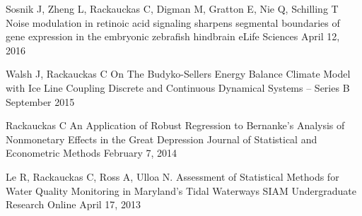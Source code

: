 

\begin{cventries}
	
\cventry
{Sosnik J, Zheng L, Rackauckas C, Digman M, Gratton E, Nie Q, Schilling T} %
{Noise modulation in retinoic acid signaling sharpens segmental boundaries of gene expression in the embryonic zebrafish hindbrain} %
{eLife Sciences} %
{April 12, 2016} %
{}

\cventry
{Walsh J, Rackauckas C} %
{On The Budyko-Sellers Energy Balance Climate Model with Ice Line Coupling} %
{Discrete and Continuous Dynamical Systems – Series B} %
{September 2015} %
{}


  \cventry
    {Rackauckas C} %
    {An Application of Robust Regression to Bernanke’s Analysis of Nonmonetary Effects in the Great Depression} %
    {Journal of Statistical and Econometric Methods} %
    {February 7, 2014} %
    {}

  \cventry
    {Le R, Rackauckas C, Ross A, Ulloa N.} %
    {Assessment of Statistical Methods for Water Quality Monitoring in Maryland's Tidal Waterways} %
    {SIAM Undergraduate Research Online} %
    {April 17, 2013} %
    {}

\end{cventries}


